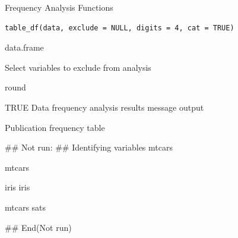 \documentclass[a4paper]{book}
\begin{document}
%
\begin{Description}
Frequency Analysis Functions
\end{Description}
%
\begin{Usage}
\begin{verbatim}
table_df(data, exclude = NULL, digits = 4, cat = TRUE)
\end{verbatim}
\end{Usage}
%
\begin{Arguments}
\begin{ldescription}
\item[\code{data}] data.frame

\item[\code{exclude}] Select variables to exclude from analysis

\item[\code{digits}] round

\item[\code{cat}] TRUE Data frequency analysis results message output
\end{ldescription}
\end{Arguments}
%
\begin{Value}
Publication frequency table
\end{Value}
%
\begin{Examples}
\begin{ExampleCode}

\#\# Not run: 
## Identifying variables
 mtcars %

 mtcars %

 iris %
 iris %


 mtcars %
 sats %



## End(Not run)


\end{ExampleCode}
\end{Examples}
\end{document}
